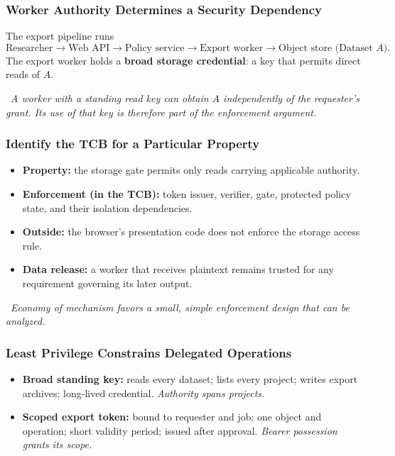 \documentclass[hidelinks]{article}
\newcommand{\callout}[1]{\par\smallskip\noindent{\color{capri}$\blacktriangleright$}\ \textit{#1}\par\smallskip}
\begin{document}
\subsubsection{Worker Authority Determines a Security Dependency}

The export pipeline runs
\[
\text{Researcher} \to \text{Web API} \to \text{Policy service} \to \text{Export worker} \to \text{Object store (Dataset } A\text{)}.
\]
The export worker holds a \textbf{broad storage credential}: a key that permits direct reads of $A$.

\callout{A worker with a standing read key can obtain $A$ independently of the requester's grant. Its use of that key is therefore part of the enforcement argument.}

\subsubsection{Identify the TCB for a Particular Property}

\begin{itemize}
    \item \textbf{Property:} the storage gate permits only reads carrying applicable authority.
    \item \textbf{Enforcement (in the TCB):} token issuer, verifier, gate, protected policy state, and their isolation dependencies.
    \item \textbf{Outside:} the browser's presentation code does not enforce the storage access rule.
    \item \textbf{Data release:} a worker that receives plaintext remains trusted for any requirement governing its later output.
\end{itemize}

\callout{Economy of mechanism favors a small, simple enforcement design that can be analyzed.}

\subsubsection{Least Privilege Constrains Delegated Operations}

\begin{itemize}
    \item \textbf{Broad standing key:} reads every dataset; lists every project; writes export archives; long-lived credential. \textit{Authority spans projects.}
    \item \textbf{Scoped export token:} bound to requester and job; one object and operation; short validity period; issued after approval. \textit{Bearer possession grants its scope.}
\end{itemize}
\end{document}
